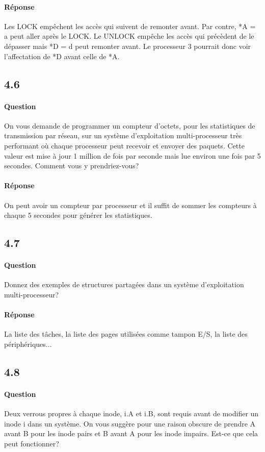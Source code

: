 \documentclass[oneside]{book}
\begin{document}
\paragraph{Réponse}
Les LOCK empêchent les accès qui suivent de remonter avant. Par contre, *A =
a peut aller après le LOCK. Le UNLOCK empêche les accès qui précèdent de le
dépasser mais *D = d peut remonter avant. Le processeur 3 pourrait donc voir
l'affectation de *D avant celle de *A.
\subsection{4.6}
\paragraph{Question}
On vous demande de programmer un compteur d'octets, pour les statistiques de
transmission par réseau, sur un système d'exploitation multi-processeur très
performant où chaque processeur peut recevoir et envoyer des paquets. Cette
valeur est mise à jour 1 million de fois par seconde mais lue environ une fois par 5
secondes. Comment vous y prendriez-vous?
\paragraph{Réponse}
On peut avoir un compteur par processeur et il suffit de sommer les compteurs à
chaque 5 secondes pour générer les statistiques.
\subsection{4.7}
\paragraph{Question}
Donnez des exemples de structures partagées dans un système d'exploitation
multi-processeur?
\paragraph{Réponse}
La liste des tâches, la liste des pages utilisées comme tampon E/S, la liste des
périphériques...
\subsection{4.8}
\paragraph{Question}
Deux verrous propres à chaque inode, i.A et i.B, sont requis avant de modifier un
inode i dans un système. On vous suggère pour une raison obscure de prendre A
avant B pour les inode pairs et B avant A pour les inode impairs. Est-ce que cela
peut fonctionner?
\end{document}
